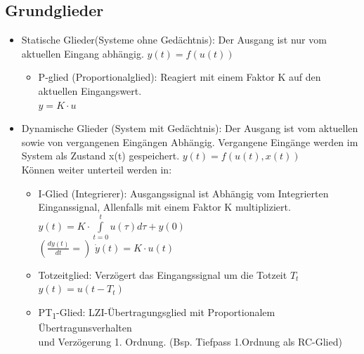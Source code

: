 \documentclass[margin=normal]{tex/hsrzf}
\begin{document}
\subsection{Grundglieder}
\label{Grundglieder}
\begin{itemize}
      \item Statische Glieder(Systeme ohne Gedächtnis):
            Der Ausgang ist nur vom aktuellen Eingang abhängig.
            $y(t)=f(u(t))$
            \begin{itemize}
                  \item P-glied (Proportionalglied): Reagiert mit einem Faktor K auf den aktuellen Eingangswert.\\
                        $y = K \cdot u$
            \end{itemize}
      \item Dynamische Glieder (System mit Gedächtnis):
            Der Ausgang ist vom aktuellen sowie von vergangenen Eingängen Abhängig.
            Vergangene Eingänge werden im System als Zustand x(t) gespeichert.
            $y(t)=f(u(t),x(t))$ \\Können weiter unterteil werden in:
            \begin{itemize}
                  \item I-Glied (Integrierer):
                        Ausgangssignal ist Abhängig vom Integrierten Einganssignal, Allenfalls mit einem Faktor K multipliziert. \\
                        $y(t) = K \cdot \int \limits _{t=0} ^{t} u(\tau) d\tau + y(0)$ \\
                        $(\frac{dy(t)}{dt} =)$ \space $\dot{y}(t) = K \cdot u(t) $
                  \item Totzeitglied: Verzögert das Eingangssignal um die Totzeit $T_t$\\
                        $y(t) = u(t-T_t)$
                  \item PT\textsubscript{1}-Glied:
                        LZI-Übertragungsglied mit Proportionalem Übertragunsverhalten \\
                        und Verzögerung 1. Ordnung. (Bsp. Tiefpass 1.Ordnung als RC-Glied)


\end{itemize}
\end{itemize}
\end{document}
